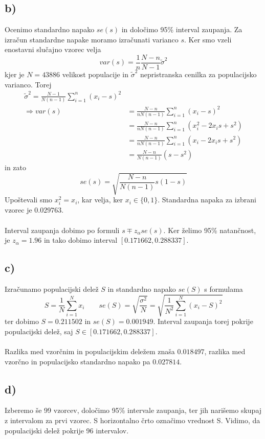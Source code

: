 \documentclass[A4paper, 11pt]{article}
\begin{document}
\subsection*{b)}
Ocenimo standardno napako $se(s)$ in določimo 95\% interval zaupanja. Za izračun standardne napake moramo izračunati varianco $s$. Ker smo vzeli enostavni slučajno vzorec velja
\[ var(s) = \frac{1}{n} \frac{N - n}{N - 1} \tilde{\sigma}^2 \]
kjer je $N=43886$ velikost populacije in $\tilde{\sigma}^2$ nepristranska cenilka za populacijsko varianco. Torej
\[ 
\begin{split}
\tilde{\sigma}^2 = \frac{N - 1}{N (n - 1)} \sum_{i=1}^{n} (x_i - s)^2 \\
\Rightarrow var(s) & = \frac{N - n}{n N (n - 1)} \sum_{i=1}^{n} (x_i - s)^2 \\
		         & = \frac{N - n}{n N (n - 1)} \sum_{i=1}^{n} (x_i^2 - 2x_i s + s^2) \\
		         & = \frac{N - n}{n N (n - 1)} \sum_{i=1}^{n} (x_i - 2x_i s + s^2) \\
		         & = \frac{N - n}{N (n - 1)} (s - s^2)
\end{split}
\]
in zato
\[ se(s) = \sqrt{ \frac{N - n}{N (n - 1)} s (1 - s)} \]
Upoštevali smo $x_i ^2 = x_i$, kar velja, ker $x_i \in \{0,1\}$. Standardna napaka za izbrani vzorec je $0.029763$. \\
\\
Interval zaupanja dobimo po formuli $s \mp z_\alpha se(s)$. Ker želimo 95\% natančnost, je $z_\alpha = 1.96$ in tako dobimo interval $[0.171662, 0.288337]$.

\subsection*{c)}
Izračunamo populacijski delež $S$ in standardno napako $se(S)$ s formulama
\[ S = \frac{1}{N} \sum_{i=1}^{N} x_i  \qquad se(S) = \sqrt{\frac{\sigma ^2}{N}} = \sqrt{\frac{1}{N^2} \sum_{i=1}^{N} (x_i - S)^2} \]
ter dobimo $S=0.211502$ in $se(S)=0.001949$. Interval zaupanja torej pokrije populacijski delež, saj $S \in [0.171662, 0.288337]$. \\
\\
Razlika med vzorčnim in populacijskim deležem znaša $0.018497$, razlika med vzorčno in populacijsko standardno napako pa $0.027814$.

\subsection*{d)}
Izberemo še 99 vzorcev, določimo 95\% intervale zaupanja, ter jih narišemo skupaj z intervalom za prvi vzorec. S horizontalno črto označimo vrednost S. Vidimo, da populacijski delež pokrije 96 intervalov.
\end{document}

